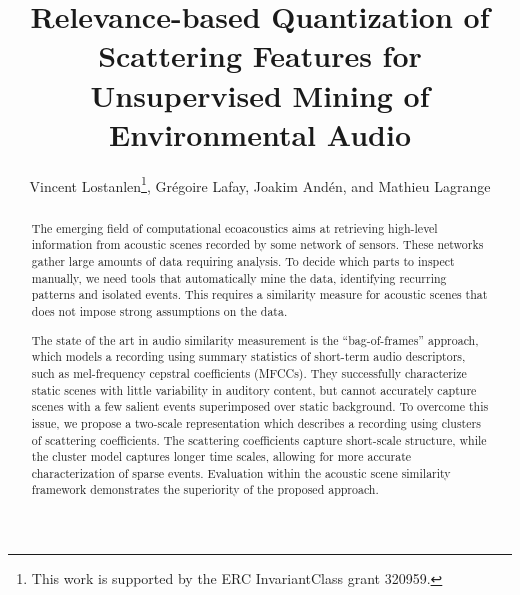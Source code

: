 \documentclass[smallextended]{svjour3}
\begin{document}
%
\title{Relevance-based Quantization of Scattering Features for Unsupervised Mining of Environmental Audio}

\author{Vincent Lostanlen\thanks{This work is supported by the ERC InvariantClass grant 320959.}, Gr\'egoire Lafay, Joakim And\'en, and Mathieu Lagrange}


\maketitle

\begin{abstract}
The emerging field of computational ecoacoustics aims at retrieving high-level information from acoustic scenes recorded by some network of sensors. These networks gather large amounts of data requiring analysis. To decide which parts to inspect manually, we need tools that automatically mine the data, identifying recurring patterns and isolated events. This requires a similarity measure for acoustic scenes that does not impose strong assumptions on the data.

The state of the art in audio similarity measurement is the ``bag-of-frames'' approach, which models a recording using summary statistics of short-term audio descriptors, such as mel-frequency cepstral coefficients (MFCCs). They successfully characterize static scenes with little variability in auditory content, but cannot accurately capture scenes with a few salient events superimposed over static background.
To overcome this issue, we propose a two-scale representation which describes a recording using clusters of scattering coefficients. The scattering coefficients capture short-scale structure, while the cluster model captures longer time scales, allowing for more accurate characterization of sparse events. Evaluation within the acoustic scene similarity framework demonstrates the superiority of the proposed approach.
\end{abstract}
\end{document}
